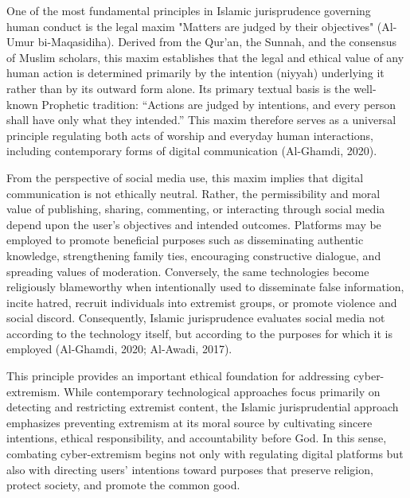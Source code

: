 \documentclass[10pt]{NSP1}
\begin{document}
\par\medskip{}\smallskip

One of the most fundamental principles in Islamic jurisprudence governing human conduct is the legal maxim "Matters are judged by their objectives" (Al-Umur bi-Maqasidiha). Derived from the Qur'an, the Sunnah, and the consensus of Muslim scholars, this maxim establishes that the legal and ethical value of any human action is determined primarily by the intention (niyyah) underlying it rather than by its outward form alone. Its primary textual basis is the well-known Prophetic tradition: “Actions are judged by intentions, and every person shall have only what they intended.” This maxim therefore serves as a universal principle regulating both acts of worship and everyday human interactions, including contemporary forms of digital communication (Al-Ghamdi, 2020).

From the perspective of social media use, this maxim implies that digital communication is not ethically neutral. Rather, the permissibility and moral value of publishing, sharing, commenting, or interacting through social media depend upon the user's objectives and intended outcomes. Platforms may be employed to promote beneficial purposes such as disseminating authentic knowledge, strengthening family ties, encouraging constructive dialogue, and spreading values of moderation. Conversely, the same technologies become religiously blameworthy when intentionally used to disseminate false information, incite hatred, recruit individuals into extremist groups, or promote violence and social discord. Consequently, Islamic jurisprudence evaluates social media not according to the technology itself, but according to the purposes for which it is employed (Al-Ghamdi, 2020; Al-Awadi, 2017).

This principle provides an important ethical foundation for addressing cyber-extremism. While contemporary technological approaches focus primarily on detecting and restricting extremist content, the Islamic jurisprudential approach emphasizes preventing extremism at its moral source by cultivating sincere intentions, ethical responsibility, and accountability before God. In this sense, combating cyber-extremism begins not only with regulating digital platforms but also with directing users' intentions toward purposes that preserve religion, protect society, and promote the common good.
\end{document}
